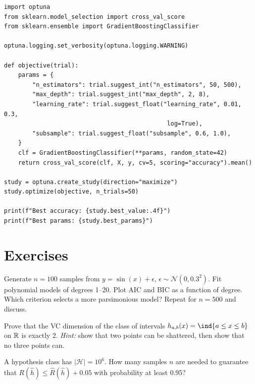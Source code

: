 \begin{codeblock}[title=\textbf{Bayesian Optimisation with Optuna}]
\begin{verbatim}
import optuna
from sklearn.model_selection import cross_val_score
from sklearn.ensemble import GradientBoostingClassifier

optuna.logging.set_verbosity(optuna.logging.WARNING)

def objective(trial):
    params = {
        "n_estimators": trial.suggest_int("n_estimators", 50, 500),
        "max_depth": trial.suggest_int("max_depth", 2, 8),
        "learning_rate": trial.suggest_float("learning_rate", 0.01, 0.3,
                                              log=True),
        "subsample": trial.suggest_float("subsample", 0.6, 1.0),
    }
    clf = GradientBoostingClassifier(**params, random_state=42)
    return cross_val_score(clf, X, y, cv=5, scoring="accuracy").mean()

study = optuna.create_study(direction="maximize")
study.optimize(objective, n_trials=50)

print(f"Best accuracy: {study.best_value:.4f}")
print(f"Best params: {study.best_params}")
\end{verbatim}
\end{codeblock}

\section{Exercises}

\begin{exercise}
Generate $n=100$ samples from $y=\sin(x)+\epsilon$, $\epsilon\sim\mathcal{N}(0,0.3^2)$. Fit polynomial models of degrees 1--20. Plot AIC and BIC as a function of degree. Which criterion selects a more parsimonious model? Repeat for $n=500$ and discuss.
\end{exercise}

\begin{exercise}
Prove that the VC dimension of the class of intervals $h_{a,b}(x)=\ind\{a\leq x\leq b\}$ on $\mathbb{R}$ is exactly 2. \emph{Hint:} show that two points can be shattered, then show that no three points can.
\end{exercise}

\begin{exercise}
A hypothesis class has $|\mathcal{H}|=10^6$. How many samples $n$ are needed to guarantee that $R(\hat h)\leq\hat R(\hat h)+0.05$ with probability at least 0.95?
\end{exercise}

